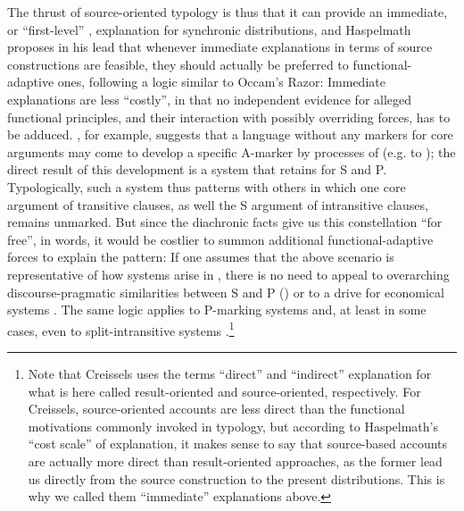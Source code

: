 \documentclass[output=paper]{langsci/langscibook}
\begin{document}
The  thrust of source-oriented typology is thus that it can provide an immediate, or “first-level” \citep[1]{Creissels2008}, explanation for synchronic distributions, and Haspelmath proposes in his lead  that whenever immediate explanations in terms of source constructions are feasible, they should actually be preferred to functional-adaptive ones, following a logic similar to Occam’s Razor: Immediate explanations are less “costly”, in that no independent evidence for alleged functional principles, and their interaction with possibly overriding forces, has to be adduced. \citet{Cristofaro2014}, for example, suggests that a language without any  markers for core arguments may come to develop a specific A-marker by processes of  (e.g.  to  ); the direct result of this development is a  system that retains  for S and P. Typologically, such a system thus patterns with others in which one core argument of transitive clauses, as well the S argument of intransitive clauses, remains unmarked. But since the diachronic facts give us this constellation “for free”, in  words, it would be costlier to summon additional functional-adaptive forces to explain the pattern: If one assumes that the above scenario is representative of how   systems arise in , there is no need to appeal to overarching discourse-pragmatic similarities between S and P (\citealt{DuBois1987}) or to a  drive for economical  systems \citep{Comrie1989}. The same logic applies to P-marking systems and, at least in some cases, even to split-intransitive systems \citep{Creissels2008}.\footnote{Note that Creissels uses the terms “direct” and “indirect” explanation for what is here called result-oriented and source-oriented, respectively. For Creissels, source-oriented accounts are less direct than the functional motivations commonly invoked in typology, but according to Haspelmath’s “cost scale” of explanation, it makes sense to say that source-based accounts are actually more direct than result-oriented approaches, as the former lead us directly from the source construction to the present distributions. This is why we called them “immediate” explanations above.} 
\end{document}
